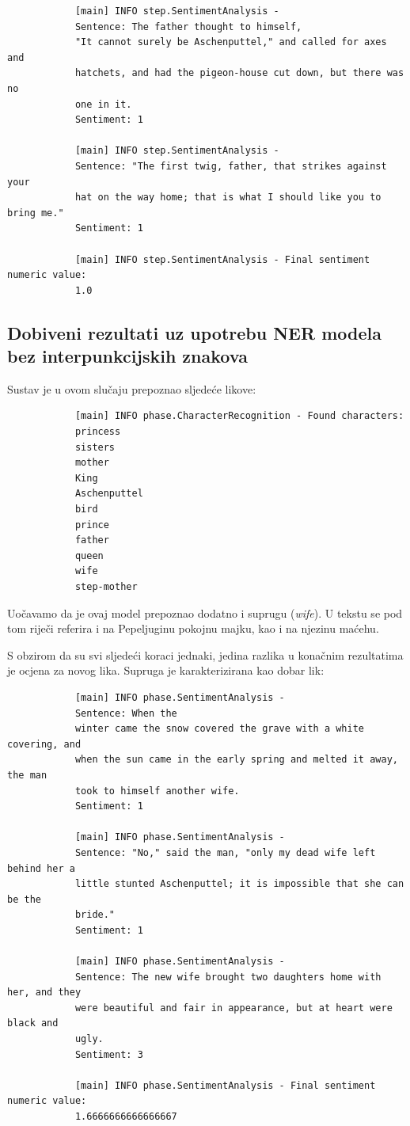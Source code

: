 \documentclass[a4paper,twoside,12pt]{memoir} %
\newcommand{\ti}[1]{\textit{#1\/}}
\begin{document}
		\begin{verbatim}
			[main] INFO step.SentimentAnalysis -
			Sentence: The father thought to himself,
			"It cannot surely be Aschenputtel," and called for axes and
			hatchets, and had the pigeon-house cut down, but there was no
			one in it.
			Sentiment: 1

			[main] INFO step.SentimentAnalysis -
			Sentence: "The first twig, father, that strikes against your
			hat on the way home; that is what I should like you to bring me."
			Sentiment: 1

			[main] INFO step.SentimentAnalysis - Final sentiment numeric value:
			1.0
		\end{verbatim}

		\subsection{Dobiveni rezultati uz upotrebu NER modela bez interpunkcijskih znakova}

		Sustav je u ovom slučaju prepoznao sljedeće likove:

		\begin{verbatim}
			[main] INFO phase.CharacterRecognition - Found characters:
			princess
			sisters
			mother
			King
			Aschenputtel
			bird
			prince
			father
			queen
			wife
			step-mother
		\end{verbatim}

		Uočavamo da je ovaj model prepoznao dodatno i suprugu (\ti{wife}). U tekstu se pod tom riječi referira i na Pepeljuginu pokojnu majku, kao i na njezinu maćehu.

		\bigskip

		S obzirom da su svi sljedeći koraci jednaki, jedina razlika u konačnim rezultatima je ocjena za novog lika. Supruga je karakterizirana kao dobar lik:

		\begin{verbatim}
			[main] INFO phase.SentimentAnalysis -
			Sentence: When the
			winter came the snow covered the grave with a white covering, and
			when the sun came in the early spring and melted it away, the man
			took to himself another wife.
			Sentiment: 1

			[main] INFO phase.SentimentAnalysis -
			Sentence: "No," said the man, "only my dead wife left behind her a
			little stunted Aschenputtel; it is impossible that she can be the
			bride."
			Sentiment: 1

			[main] INFO phase.SentimentAnalysis -
			Sentence: The new wife brought two daughters home with her, and they
			were beautiful and fair in appearance, but at heart were black and
			ugly.
			Sentiment: 3

			[main] INFO phase.SentimentAnalysis - Final sentiment numeric value:
			1.6666666666666667
		\end{verbatim}
\end{document}
